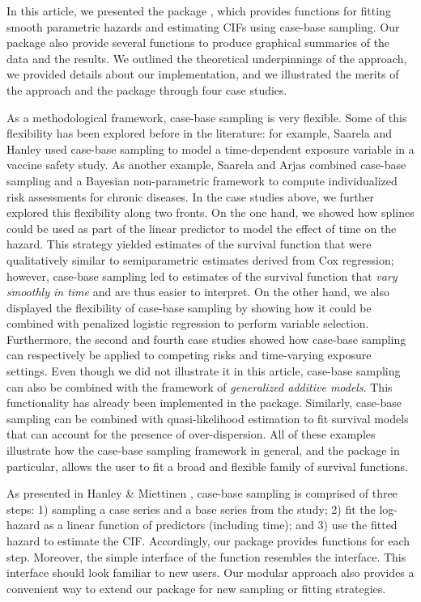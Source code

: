 \documentclass[
]{jss}
\begin{document}
In this article, we presented the  package ,
which provides functions for fitting smooth parametric hazards and
estimating CIFs using case-base sampling. Our package also provide
several functions to produce graphical summaries of the data and the
results. We outlined the theoretical underpinnings of the approach, we
provided details about our implementation, and we illustrated the merits
of the approach and the package through four case studies.

As a methodological framework, case-base sampling is very flexible. Some
of this flexibility has been explored before in the literature: for
example, Saarela and Hanley \citeyearpar{saarela2015case} used case-base
sampling to model a time-dependent exposure variable in a vaccine safety
study. As another example, Saarela and Arjas
\citeyearpar{saarela2015non} combined case-base sampling and a Bayesian
non-parametric framework to compute individualized risk assessments for
chronic diseases. In the case studies above, we further explored this
flexibility along two fronts. On the one hand, we showed how splines
could be used as part of the linear predictor to model the effect of
time on the hazard. This strategy yielded estimates of the survival
function that were qualitatively similar to semiparametric estimates
derived from Cox regression; however, case-base sampling led to
estimates of the survival function that \emph{vary smoothly in time} and
are thus easier to interpret. On the other hand, we also displayed the
flexibility of case-base sampling by showing how it could be combined
with penalized logistic regression to perform variable selection.
Furthermore, the second and fourth case studies showed how case-base
sampling can respectively be applied to competing risks and time-varying
exposure settings. Even though we did not illustrate it in this article,
case-base sampling can also be combined with the framework of
\emph{generalized additive models}. This functionality has already been
implemented in the package. Similarly, case-base sampling can be
combined with quasi-likelihood estimation to fit survival models that
can account for the presence of over-dispersion. All of these examples
illustrate how the case-base sampling framework in general, and the
package  in particular, allows the user to fit a broad and
flexible family of survival functions.

As presented in Hanley \& Miettinen \citeyearpar{hanley2009fitting},
case-base sampling is comprised of three steps: 1) sampling a case
series and a base series from the study; 2) fit the log-hazard as a
linear function of predictors (including time); and 3) use the fitted
hazard to estimate the CIF. Accordingly, our package provides functions
for each step. Moreover, the simple interface of the
 function resembles the  interface.
This interface should look familiar to new users. Our modular approach
also provides a convenient way to extend our package for new sampling or
fitting strategies.
\end{document}
